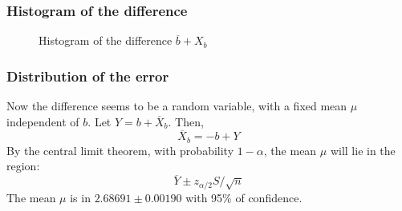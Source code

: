 \documentclass[serif, 12pt]{beamer}
\begin{document}

\begin{frame}

\frametitle{Histogram of the difference}

\begin{figure}[h]
	\caption{Histogram of the difference $\overline b+X_b$}
	\label{fig:errhh}
\end{figure}

\end{frame}


\begin{frame}

\frametitle{Distribution of the error}

Now the difference seems to be a random variable, with a fixed mean $\mu$ 
independent of $b$.
%
Let $Y = b + \overline X_b$. Then,
%
$$ \overline X_b = -b + Y $$
%
By the central limit theorem, with probability $1-\alpha$, the mean $\mu$ will 
lie in the region:
%
$$\overline Y \pm z_{\alpha/2}S/\sqrt{n}$$
%
The mean $\mu$ is in $2.68691\pm0.00190$ with 95\% of confidence.
%
%



\end{frame}

\end{document}
